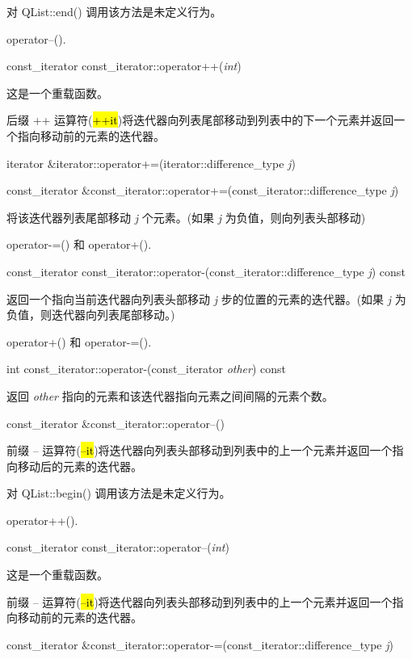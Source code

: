 对 QList::end() 调用该方法是未定义行为。

\begin{seeAlso}
operator--().
\end{seeAlso}

const\_iterator const\_iterator::operator++(\emph{int})

这是一个重载函数。

后缀 ++ 运算符(\hl{++it})将迭代器向列表尾部移动到列表中的下一个元素并返回一个指向移动前的元素的迭代器。

iterator \&iterator::operator+=(iterator::difference\_type \emph{j})

const\_iterator \&const\_iterator::operator+=(const\_iterator::difference\_type \emph{j})

将该迭代器列表尾部移动 \emph{j} 个元素。(如果 \emph{j} 为负值，则向列表头部移动)

\begin{seeAlso}
operator-=() 和 operator+().
\end{seeAlso}

const\_iterator const\_iterator::operator-(const\_iterator::difference\_type \emph{j}) const

返回一个指向当前迭代器向列表头部移动 \emph{j} 步的位置的元素的迭代器。(如果 \emph{j} 为负值，则迭代器向列表尾部移动。)

\begin{seeAlso}
operator+() 和 operator-=().
\end{seeAlso}

int const\_iterator::operator-(const\_iterator \emph{other}) const

返回 \emph{other} 指向的元素和该迭代器指向元素之间间隔的元素个数。

const\_iterator \&const\_iterator::operator--()

前缀 -- 运算符(\hl{--it})将迭代器向列表头部移动到列表中的上一个元素并返回一个指向移动后的元素的迭代器。

对 QList::begin() 调用该方法是未定义行为。


\begin{seeAlso}
operator++().
\end{seeAlso}


const\_iterator const\_iterator::operator--(\emph{int})

这是一个重载函数。

前缀 -- 运算符(\hl{--it})将迭代器向列表头部移动到列表中的上一个元素并返回一个指向移动前的元素的迭代器。

const\_iterator \&const\_iterator::operator-=(const\_iterator::difference\_type \emph{j})

